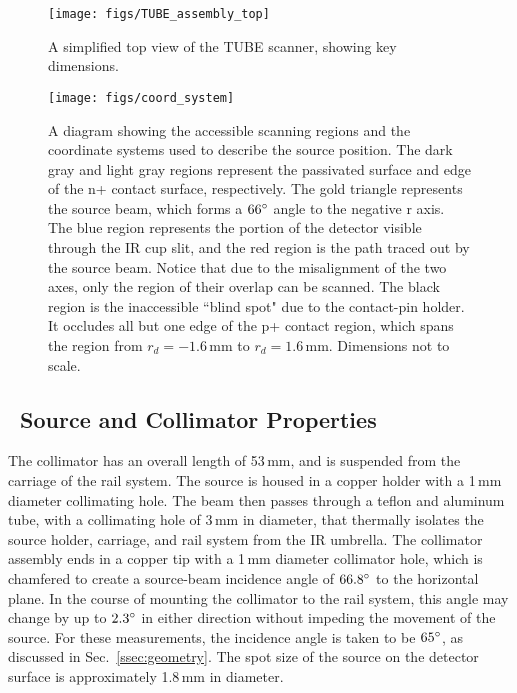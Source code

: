 \documentclass[groupedaddress,rmp,amsmath,amssymb,bibnotes,altaffilletter,twocolumn]{revtex4-1}
\begin{document}
\begin{figure}[h]
 \centering
 \texttt{[image: figs/TUBE\_assembly\_top]}
 \caption{A simplified top view of the TUBE scanner, showing key dimensions.} 
 \label{fig:TUBE_top}
\end{figure}

\begin{figure}[]
 \centering
 \texttt{[image: figs/coord\_system]}
 \caption{A diagram showing the accessible scanning regions and the coordinate systems used to describe the source position. The dark gray and light gray regions represent the passivated surface and edge of the n+ contact surface, respectively. The gold triangle represents the source beam, which forms a $66\degree$ angle to the negative r axis. The blue region represents the portion of the detector visible through the IR cup slit, and the red region is the path traced out by the source beam. Notice that due to the misalignment of the two axes, only the region of their overlap can be scanned. The black region is the inaccessible ``blind spot" due to the contact-pin holder. It occludes all but one edge of the p+ contact region, which spans the region from $r_d = -1.6$\,mm to $r_d = 1.6$\,mm. Dimensions not to scale.} 
 \label{fig:scan_coords}
\end{figure}


\subsection{\am\ Source and Collimator Properties}

The collimator has an overall length of 53\,mm, and is suspended from the carriage of the rail system. The source is housed in a copper holder with a 1\,mm diameter collimating hole. The beam then passes through a teflon and aluminum tube, with a collimating hole of 3\,mm in diameter, that thermally isolates the source holder, carriage, and rail system from the IR umbrella. The collimator assembly ends in a copper tip with a 1\,mm diameter collimator hole, which is chamfered to create a source-beam incidence angle of $66.8\degree$ to the horizontal plane. In the course of mounting the collimator to the rail system, this angle may change by up to $2.3\degree$ in either direction without impeding the movement of the source. For these measurements, the incidence angle is taken to be $65\degree$, as discussed in Sec.~\ref{ssec:geometry}. The spot size of the source on the detector surface is approximately 1.8\,mm in diameter. 
\end{document}
